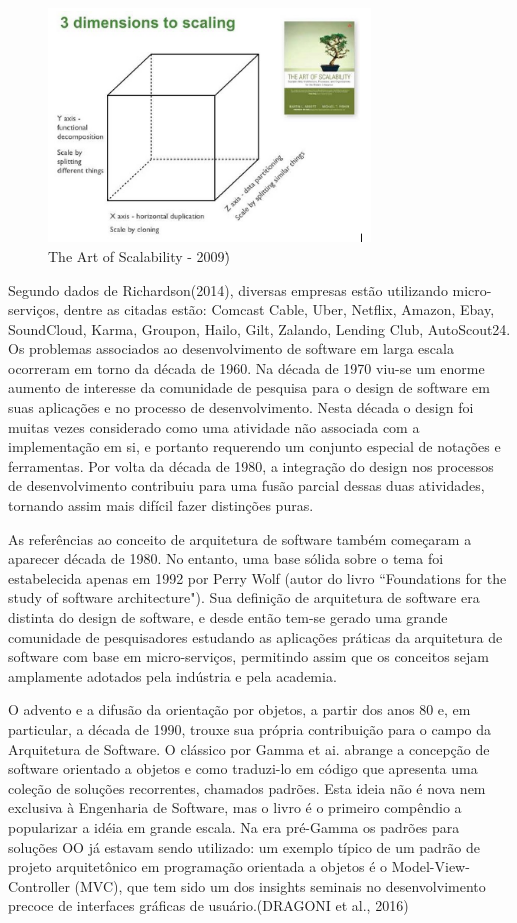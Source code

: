 \begin{figure}[h]
\centering
\includegraphics[height=6.2cm]{imagens/scalability}
\caption{The Art of Scalability - 2009)\.}
\label{fig:exemplo}
\end{figure}


Segundo dados de Richardson(2014), diversas empresas estão utilizando micro-serviços, dentre as citadas estão: Comcast Cable, Uber, Netflix, Amazon, Ebay, SoundCloud, Karma, Groupon, Hailo, Gilt, Zalando, Lending Club, AutoScout24.
Os problemas associados ao desenvolvimento de software em larga escala ocorreram em torno da década de 1960. Na década de 1970 viu-se um enorme aumento de interesse da comunidade de pesquisa para o design de software em suas aplicações e  no processo de desenvolvimento. Nesta década o design foi muitas vezes considerado como uma atividade não associada com a implementação em si, e portanto requerendo um conjunto especial de notações e ferramentas. Por volta da década de 1980, a integração do design nos processos de desenvolvimento contribuiu para uma fusão parcial dessas duas atividades, tornando assim mais difícil fazer distinções puras.

As referências ao conceito de arquitetura de software também começaram a aparecer década de 1980. No entanto, uma base sólida sobre o tema foi estabelecida apenas em 1992 por Perry Wolf (autor do livro “Foundations for the study of software architecture"). Sua definição de arquitetura de software era distinta do design de software, e desde então tem-se gerado uma grande comunidade de pesquisadores estudando as aplicações práticas da arquitetura de software com base em micro-serviços, permitindo  assim que os conceitos sejam amplamente adotados pela indústria e pela academia.

O advento e a difusão da orientação por objetos, a partir dos anos 80 e, em particular, a década de 1990, trouxe sua própria contribuição para o campo da Arquitetura de Software. O clássico por Gamma et ai. abrange a concepção de software orientado a objetos e como traduzi-lo em código que apresenta uma coleção de soluções recorrentes, chamados padrões. Esta ideia não é nova nem exclusiva à Engenharia de Software, mas o livro é o primeiro compêndio a popularizar a idéia em grande escala. Na era pré-Gamma os padrões para soluções OO já estavam sendo utilizado: um exemplo típico de um padrão de projeto arquitetônico em programação orientada a objetos é o Model-View-Controller (MVC), que tem sido um dos insights seminais no desenvolvimento precoce de interfaces gráficas de usuário.(DRAGONI et al., 2016)


